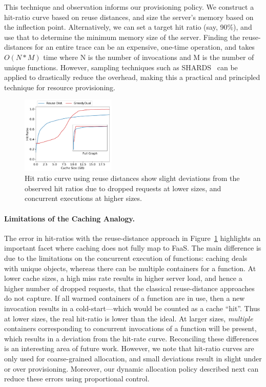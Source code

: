 This technique and observation informs our provisioning policy.
We construct a hit-ratio curve based on reuse distances, and size the server's memory based on the inflection point.
Alternatively, we can set a target hit ratio (say, 90\%), and use that to determine the minimum memory size of the server. 
%
Finding the reuse-distances for an entire trace can be an expensive, one-time operation, and takes $O(N*M)$ time where N is the number of invocations and M is the number of unique functions. 
However, sampling techniques such as SHARDS~\cite{shards} can be applied to drastically reduce the overhead, making this a practical and principled technique for resource provisioning. 



\begin{figure}[t]
  \centering
  \includegraphics[width=0.4\textwidth]{../graphs/rep-funcs-392/hit-ratio-392-b.pdf}
  \caption{Hit ratio curve using reuse distances show slight deviations from the observed hit ratios due to dropped requests at lower sizes, and concurrent executions at higher sizes.}
  \label{fig:hrc}
\end{figure}

\paragraph{Limitations of the Caching Analogy.}
The error in hit-ratios with the reuse-distance approach in Figure~\ref{fig:hrc} highlights an important facet where caching does not fully map to FaaS.
The main difference is due to the limitations on the concurrent execution of functions: 
caching deals with unique objects, whereas there can be  multiple containers for a function. 
%
At lower cache sizes, a high miss rate results in higher server load, and hence a higher number of dropped requests, that the classical reuse-distance approaches do not capture.
If all warmed containers of a function are in use, then a new invocation results in a cold-start---which would be counted as a cache ``hit''.
Thus at lower sizes, the real hit-ratio is lower than the ideal. 
At larger sizes, \emph{multiple} containers corresponding to concurrent invocations of a function will be present, which results in a deviation from the hit-rate curve. 
Reconciling these differences is an interesting area of future work. %
However, we note that hit-ratio curves are only used for coarse-grained allocation, and small deviations result in slight under or over provisioning. 
Moreover, our dynamic allocation policy described next can reduce these errors using proportional control. 

